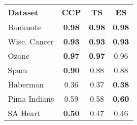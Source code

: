 \begin{tabular}{lccc}
\toprule
Dataset & CCP & TS & ES \\
\midrule
Banknote & \textbf{0.98} & \textbf{0.98} & \textbf{0.98} \\
Wisc. Cancer & \textbf{0.93} & \textbf{0.93} & \textbf{0.93} \\
Ozone & \textbf{0.97} & \textbf{0.97} & 0.96 \\
Spam & \textbf{0.90} & 0.88 & 0.88 \\
Haberman & 0.36 & 0.37 & \textbf{0.38} \\
Pima Indians & 0.59 & 0.58 & \textbf{0.60} \\
SA Heart & \textbf{0.50} & 0.47 & 0.46 \\
\bottomrule
\end{tabular}